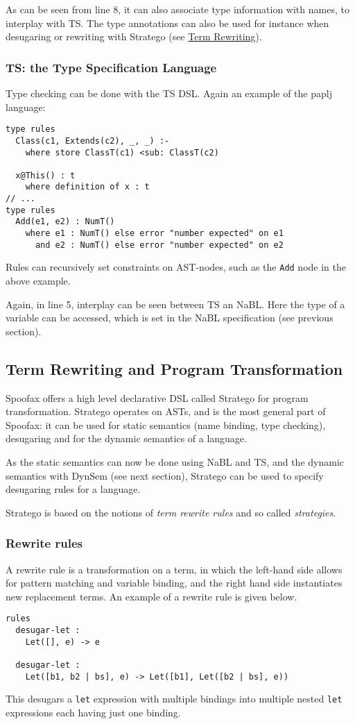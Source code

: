 As can be seen from line 8, it can also associate type information
with names, to interplay with TS. The type annotations can also be
used for instance when desugaring or rewriting with Stratego (see \hyperref[sec-term-rewrite]{Term
Rewriting}).
\subsubsection{TS: the Type Specification Language}
\label{sec:orgheadline3}
Type checking can be done with the TS DSL. Again an example of the
paplj language:
\begin{verbatim}
type rules
  Class(c1, Extends(c2), _, _) :-
    where store ClassT(c1) <sub: ClassT(c2)

  x@This() : t
    where definition of x : t
// ...
type rules
  Add(e1, e2) : NumT()
    where e1 : NumT() else error "number expected" on e1
      and e2 : NumT() else error "number expected" on e2
\end{verbatim}
Rules can recursively set constraints on AST-nodes, such as the \texttt{Add}
node in the above example.

Again, in line 5, interplay can be seen between TS an NaBL. Here the
type of a variable can be accessed, which is set in the NaBL
specification (see previous section).
\subsection{Term Rewriting and Program Transformation}
\label{sec-term-rewrite}
Spoofax offers a high level declarative DSL called Stratego for program
transformation. Stratego operates on ASTs, and is the most general
part of Spoofax: it can be used for static semantics (name binding,
type checking), desugaring and for the dynamic semantics of a
language.

As the static semantics can now be done using NaBL and TS, and the
dynamic semantics with DynSem (see next section), Stratego can be used
to specify desugaring rules for a language.

Stratego is based on the notions of \emph{term rewrite rules} and so called
\emph{strategies}.
\subsubsection{Rewrite rules}
\label{sec:orgheadline4}
A rewrite rule is a transformation on a term, in which
the left-hand side allows for pattern matching and variable binding,
and the right hand side instantiates new replacement terms. An example
of a rewrite rule is given below.
\begin{verbatim}
rules
  desugar-let :
  	Let([], e) -> e

  desugar-let :
  	Let([b1, b2 | bs], e) -> Let([b1], Let([b2 | bs], e))
\end{verbatim}
This desugars a \texttt{let} expression with multiple bindings into multiple
nested \texttt{let} expressions each having just one binding.
